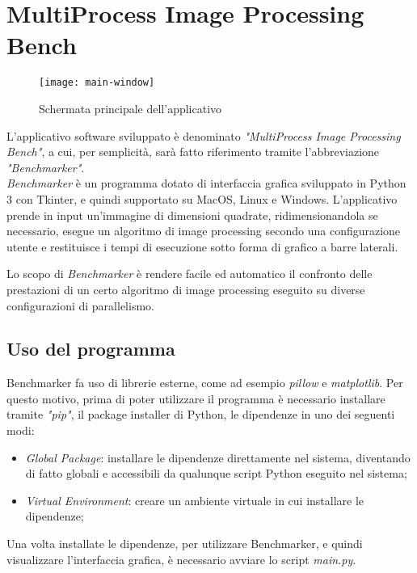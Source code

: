 \chapter{MultiProcess Image Processing Bench}
\begin{figure}[H]
	\centering
	\texttt{[image: main-window]}
	\caption{Schermata principale dell'applicativo}
\end{figure}
L'applicativo software sviluppato è denominato \textit{"MultiProcess Image Processing Bench"}, a cui, per semplicità, sarà fatto riferimento tramite l'abbreviazione \textit{"Benchmarker"}.\\
\newline
\textit{Benchmarker} è un programma dotato di interfaccia grafica sviluppato in Python 3 con Tkinter, e quindi supportato su MacOS, Linux e Windows. L'applicativo prende in input un'immagine di dimensioni quadrate, ridimensionandola se necessario, esegue un algoritmo di image processing secondo una configurazione utente e restituisce i tempi di esecuzione sotto forma di grafico a barre laterali.\par
Lo scopo di \textit{Benchmarker} è rendere facile ed automatico il confronto delle prestazioni di un certo algoritmo di image processing eseguito su diverse configurazioni di parallelismo.

\section{Uso del programma}
Benchmarker fa uso di librerie esterne, come ad esempio \textit{pillow} e \textit{matplotlib}. Per questo motivo, prima di poter utilizzare il programma è necessario installare tramite \textit{"pip"}, il package installer di Python, le dipendenze in uno dei seguenti modi:
\begin{itemize}
	\item \textit{Global Package}: installare le dipendenze direttamente nel sistema, diventando di fatto globali e accessibili da qualunque script Python eseguito nel sistema;
	\item \textit{Virtual Environment}: creare un ambiente virtuale in cui installare le dipendenze;
\end{itemize}
Una volta installate le dipendenze, per utilizzare Benchmarker, e quindi visualizzare l'interfaccia grafica, è necessario avviare lo script \textit{main.py}.

